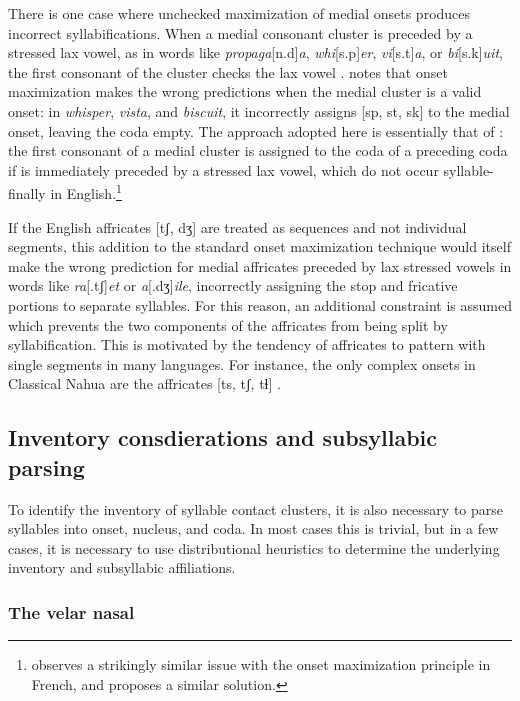 There is one case where unchecked maximization of medial onsets produces incorrect syllabifications. When a medial consonant cluster is preceded by a stressed lax vowel, as in words like \emph{propaga}[n.d]\emph{a}, \emph{whi}[s.p]\emph{er}, \emph{vi}[s.t]\emph{a}, or \emph{bi}[s.k]\emph{uit}, the first consonant of the cluster checks the lax vowel \citep[e.g.,][3]{Hammond1997}. \citet[][55]{Harris1994} notes that onset maximization makes the wrong predictions when the medial cluster is a valid onset: in \emph{whisper}, \emph{vista}, and \emph{biscuit}, it incorrectly assigns [sp, st, sk] to the medial onset, leaving the coda empty. The approach adopted here is essentially that of \citet{Pulgram1970}: the first consonant of a medial cluster is assigned to the coda of a preceding coda if is immediately preceded by a stressed lax vowel, which do not occur syllable-finally in English.\footnote{\citet[][589f.]{Lowenstamm1981} observes a strikingly similar issue with the onset maximization principle in French, and proposes a similar solution.}

If the English affricates [tʃ, dʒ] are treated as sequences and not individual segments, this addition to the standard onset maximization technique would itself make the wrong prediction for medial affricates preceded by lax stressed vowels in words like \emph{ra}[.tʃ]\emph{et} or \emph{a}[.dʒ]\emph{ile}, incorrectly assigning the stop and fricative portions to separate syllables. For this reason, an additional constraint is assumed which prevents the two components of the affricates from being split by syllabification. This is motivated by the tendency of affricates to pattern with single segments in many languages. For instance, the only complex onsets in Classical Nahua are the affricates [ts, tʃ, tɬ] \citep[][9]{Launey2011}.

\subsection{Inventory consdierations and subsyllabic parsing}

To identify the inventory of syllable contact clusters, it is also necessary to parse syllables into onset, nucleus, and coda. In most cases this is trivial, but in a few cases, it is necessary to use distributional heuristics to determine the underlying inventory and subsyllabic affiliations.

\subsubsection{The velar nasal} \label{velarnasal}

